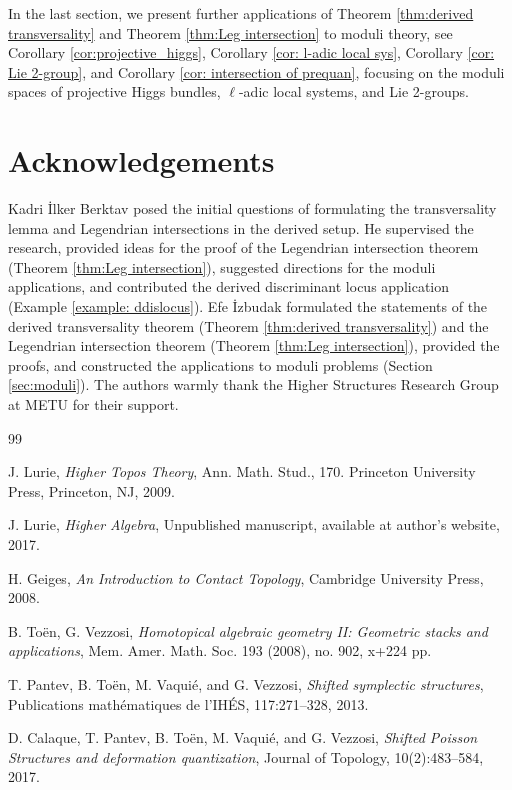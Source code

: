 \documentclass[reqno]{amsart}
\theoremstyle{definition}
\theoremstyle{remark}
\begin{document}
{In the last section, we present further applications of Theorem \ref{thm:derived transversality} and Theorem \ref{thm:Leg intersection} to moduli theory, see  Corollary \ref{cor:projective_higgs}, Corollary \ref{cor: l-adic local sys}, Corollary \ref{cor: Lie 2-group}, and Corollary \ref{cor: intersection of prequan}, focusing on the moduli spaces of projective Higgs bundles, $\ell$-adic local systems, and Lie 2-groups.

\section*{Acknowledgements}
Kadri \.{I}lker Berktav posed the initial questions of formulating the transversality lemma and Legendrian intersections in the derived setup. He supervised the research, provided ideas for the proof of the Legendrian intersection theorem (Theorem \ref{thm:Leg intersection}), suggested directions for the moduli applications, and contributed the derived discriminant locus application (Example \ref{example: ddislocus}). 
Efe \.{I}zbudak formulated the statements of the derived transversality theorem (Theorem \ref{thm:derived transversality}) and the Legendrian intersection theorem (Theorem \ref{thm:Leg intersection}), provided the proofs, and constructed the applications to moduli problems (Section \ref{sec:moduli}).
The authors warmly thank the Higher Structures Research Group at METU for their support.

\begin{thebibliography}{99}

  J. Lurie,
  \textit{Higher Topos Theory},
  Ann. Math. Stud., 170. Princeton University Press,
  Princeton, NJ, 2009.

  J. Lurie,
  \textit{Higher Algebra},
  Unpublished manuscript, available at author's website, 2017.

  H. Geiges,
  \textit{An Introduction to Contact Topology},
  Cambridge University Press, 2008.

  B. To\"{e}n, G. Vezzosi,
  \textit{Homotopical algebraic geometry II: Geometric stacks and
  applications},
  Mem. Amer. Math. Soc. 193 (2008), no. 902, x+224 pp.

  T. Pantev, B. To\"{e}n, M. Vaqui\'{e}, and G. Vezzosi,
  \textit{Shifted symplectic structures},
  Publications math\'{e}matiques de l'IH\'{E}S, 117:271--328, 2013.

  D. Calaque, T. Pantev, B. To\"{e}n, M. Vaqui\'{e}, and G. Vezzosi,
  \textit{Shifted Poisson Structures and deformation quantization},
  Journal of Topology, 10(2):483--584, 2017.


\end{thebibliography}}
\end{document}

